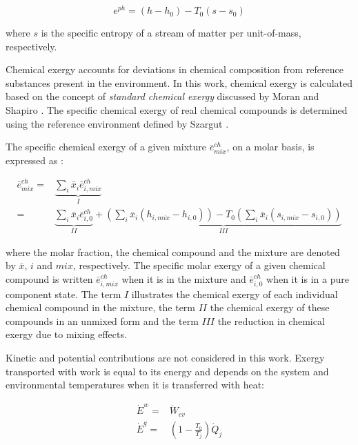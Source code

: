 \documentclass[final,times,3p]{elsarticle}
\begin{document}
	\begin{equation}
		e^{ph}=(h-h_0)-T_0(s-s_0) 
	\end{equation}
	
	where $s$ is the specific entropy of a stream of matter per unit-of-mass, respectively. 

	Chemical exergy accounts for deviations in chemical composition from reference substances present in the environment. In this work, chemical exergy is calculated based on the concept of \emph{standard chemical exergy} discussed by Moran and Shapiro \cite{Moran2007}. The specific chemical exergy of real chemical compounds is determined using the reference environment defined by Szargut \cite{Szargut1988,Szargut1989,Morris1986}.

	
	The specific chemical exergy of a given mixture $\bar{e}^{ch}_{mix}$, on a molar basis, is expressed as \cite{Sato2004}:

	\begin{align}
		\bar{e}^{ch}_{mix}=&\underbrace{\sum_i \bar{x}_i \bar{e}^{ch}_{i,mix}}_{I} \nonumber\\
		=&\underbrace{\sum_i \bar{x}_i \bar{e}^{ch}_{i,0}}_{II}+\underbrace{\left(\sum_i \bar{x}_i \left(h_{i,mix}-h_{i,0}\right)\right)-T_0\left(\sum_i \bar{x}_i \left(s_{i,mix}-s_{i,0}\right)\right)}_{III}
	\end{align}

	where the molar fraction, the chemical compound and the mixture are denoted by $\bar{x}$, $i$ and $mix$, respectively. The specific molar exergy of a given chemical compound is written $\bar{e}^{ch}_{i,mix}$ when it is in the mixture and $\bar{e}^{ch}_{i,0}$ when it is in a pure component state. The term $I$ illustrates the chemical exergy of each individual chemical compound in the mixture, the term $II$ the chemical exergy of these compounds in an unmixed form and the term $III$ the reduction in chemical exergy due to mixing effects.  
	

	Kinetic and potential contributions are not considered in this work. Exergy transported with work is equal to its energy and depends on the system and environmental temperatures when it is transferred with heat:

	\begin{align} 
		\dot{E}^w=&\dot{W}_{cv}\\
		\dot{E}^q=&\left(1-\frac{T_0}{T_j}\right)\dot{Q}_{j}
	\end{align}
\end{document}
